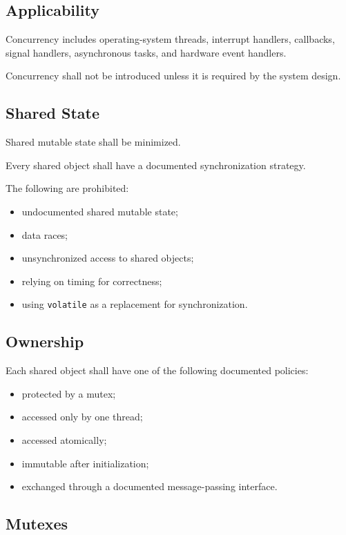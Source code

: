 \subsection{Applicability}

Concurrency includes operating-system threads, interrupt handlers, callbacks, signal handlers, asynchronous tasks, and hardware event handlers.

Concurrency shall not be introduced unless it is required by the system design.

\subsection{Shared State}

Shared mutable state shall be minimized.

Every shared object shall have a documented synchronization strategy.

The following are prohibited:

\begin{itemize}
	\item undocumented shared mutable state;
	\item data races;
	\item unsynchronized access to shared objects;
	\item relying on timing for correctness;
	\item using \texttt{volatile} as a replacement for synchronization.
\end{itemize}

\subsection{Ownership}

Each shared object shall have one of the following documented policies:

\begin{itemize}
	\item protected by a mutex;
	\item accessed only by one thread;
	\item accessed atomically;
	\item immutable after initialization;
	\item exchanged through a documented message-passing interface.
\end{itemize}

\subsection{Mutexes}

